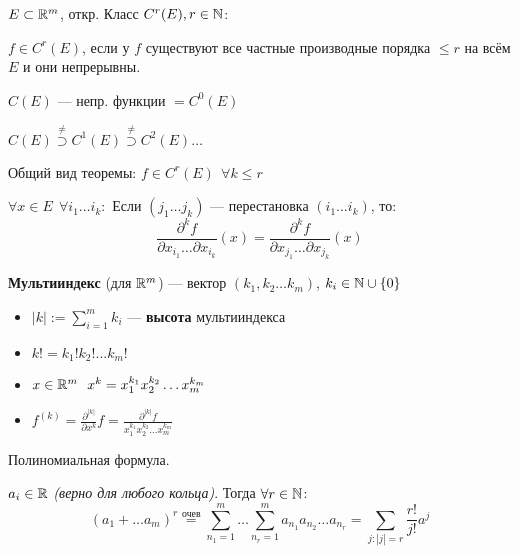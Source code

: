 \begin{remark}
    $E\subset \mathbb{R}^m$, откр. Класс $C^r(E), r\in \mathbb{N}$:

    $f\in C^r(E)$, если у $f$ существуют все частные производные порядка $\le r$ на всём $E$ и они непрерывны.

    $C(E)$ --- непр. функции $=C^0(E)$

    $C(E)\stackrel{\not=}{\supset} C^1(E)\stackrel{\not=}{\supset} C^2(E)\ldots$
\end{remark}

Общий вид теоремы: $f\in C^r(E) \ \ \forall k\le r$

$\forall x\in E \ \ \forall i_1\ldots i_k :$ Если $(j_1\ldots j_k)$ --- перестановка $(i_1\ldots i_k)$, то:
$$\frac{\partial^k f}{\partial x_{i_1}\ldots \partial x_{i_k}}(x)=\frac{\partial^k f}{\partial x_{j_1}\ldots \partial x_{j_k}}(x)$$

\begin{definition}
    \textbf{Мультииндекс} (для $\mathbb{R}^m$) --- вектор $(k_1, k_2\ldots k_m)$, $k_i\in \mathbb{N}\cup\{0\}$
    \begin{itemize}
        \item $|k|:=\sum_{i=1}^m k_i$ --- \textbf{высота} мультииндекса
        \item $k! = k_1!k_2!\ldots k_m!$
        \item $x\in\mathbb{R}^m \ \ x^k = x_1^{k_1}x_2^{k_2}\ldots x_m^{k_m}$
        \item $f^{(k)}=\frac{\partial^{|k|}}{\partial x^k} f = \frac{\partial^{|k|}f}{x_1^{k_1}x_2^{k_2}\ldots x_m^{k_m}}$
    \end{itemize}
\end{definition}

\begin{lemma}
    Полиномиальная формула.

    $a_i\in\mathbb{R}$ \textit{(верно для любого кольца)}. Тогда $\forall r\in\mathbb{N}$:
    $$(a_1+\ldots a_m)^r\stackrel{\text{очев}}=\sum_{n_1=1}^{m}\ldots \sum_{n_r=1}^{m}a_{n_1}a_{n_2}\ldots a_{n_r}=\sum_{j : |j|=r} \frac{r!}{j!}a^j$$
\end{lemma}

